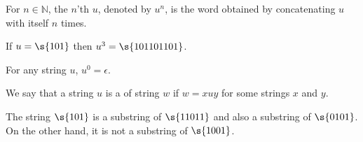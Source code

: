 \begin{flex}
\begin{definition} \label{definition:Powers-of-a-string}
For $n \in \mathbb{N}$, the $n$'th  $u$, denoted by $u^n$, is the word obtained by concatenating $u$ with itself $n$ times.
\end{definition}
\begin{example} \label{example:Third-power-of-101}
If $u = \s{101}$ then $u^3 = \s{101101101}$.
\end{example}
\begin{example} \label{example:Zeroth-power-of-a-string}
For any string $u$, $u^0 = \epsilon$.
\end{example}
\end{flex}
\begin{flex}
\begin{definition}[Substring] \label{definition:Substring}
We say that a string $u$ is a  of string $w$ if $w = xuy$ for some strings $x$ and $y$.
\end{definition}
\begin{example}[$101$ as a substring] \label{example:101-as-a-substring}
The string $\s{101}$ is a substring of $\s{11011}$ and also a substring of $\s{0101}$. 
On the other hand, it is not a substring of $\s{1001}$.
\end{example}
\end{flex}
